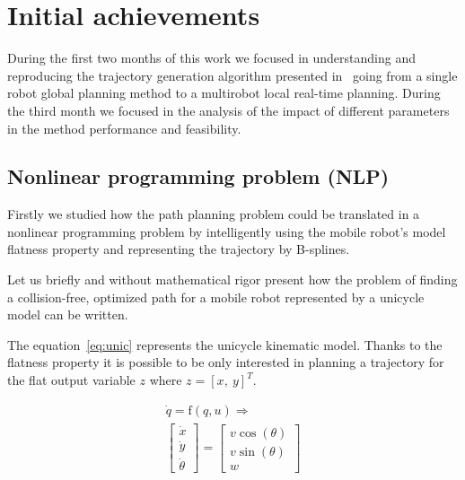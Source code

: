 \section{Initial achievements}
\label{sec:etatdelart}


During the first two months of this work we focused in understanding and reproducing the trajectory generation algorithm presented in~\cite{Defoort2007a} going from a single robot global planning method to a multirobot local real-time planning. During the third month we focused in the analysis of the impact of different parameters in the method performance and feasibility.

\subsection{Nonlinear programming problem (NLP)}

Firstly we studied how the path planning problem could be translated in a nonlinear programming problem by intelligently using the mobile robot's model flatness property and representing the trajectory by B-splines.

Let us briefly and without mathematical rigor present how the problem of finding a collision-free, optimized path for a mobile robot represented by a unicycle model can be written.

The equation~\ref{eq:unic} represents the unicycle kinematic model. Thanks to the flatness property it is possible to be only interested in planning a trajectory for the flat output variable $z$ where $z = [x,\ y]^T$.

\begin{equation}\label{eq:unic}
\begin{array}{c}
\dot{q} = \mathrm{f}(q, u) \Rightarrow\\
\left[\begin{array}{c}
\dot{x}\\
\dot{y}\\
\dot{\theta}
\end{array}\right]=
\left[\begin{array}{c}
v\cos(\theta)\\
v\sin(\theta)\\
w
\end{array}\right]
\end{array}    
\end{equation}

